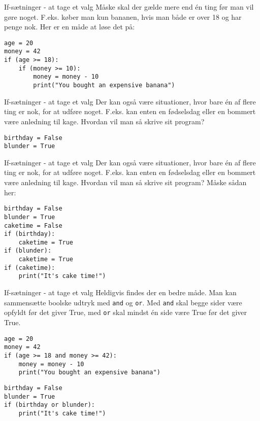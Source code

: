 \documentclass[main.tex]{subfiles}
\begin{document}
\begin{frame}[fragile]{If-sætninger - at tage et valg}
	Måske skal der gælde mere end én ting før man vil gøre noget. F.eks. køber man kun bananen, hvis man både er over 18 og har penge nok. Her er en måde at løse det på:
	\begin{lstlisting}[style=python]
age = 20
money = 42
if (age >= 18):
	if (money >= 10):
		money = money - 10
		print("You bought an expensive banana")
	\end{lstlisting}
\end{frame}

\begin{frame}[fragile]{If-sætninger - at tage et valg}
	Der kan også være situationer, hvor bare én af flere ting er nok, for at udføre noget. F.eks. kan enten en fødselsdag eller en bommert være anledning til kage. Hvordan vil man så skrive sit program?
	\begin{lstlisting}[style=python]
birthday = False
blunder = True
	\end{lstlisting}
\end{frame}

\begin{frame}[fragile]{If-sætninger - at tage et valg}
	Der kan også være situationer, hvor bare én af flere ting er nok, for at udføre noget. F.eks. kan enten en fødselsdag eller en bommert være anledning til kage. Hvordan vil man så skrive sit program? \pause Måske sådan her:
	\begin{lstlisting}[style=python]
birthday = False
blunder = True
caketime = False
if (birthday):
	caketime = True
if (blunder):
	caketime = True
if (caketime):
	print("It's cake time!")
	\end{lstlisting}
\end{frame}


\begin{frame}[fragile]{If-sætninger - at tage et valg}
	Heldigvis findes der en bedre måde. Man kan sammensætte boolske udtryk med \texttt{and} og \texttt{or}. Med \texttt{and} skal begge sider være opfyldt før det giver True, med \texttt{or} skal mindst én side være True før det giver True.
	\pause 
	\begin{lstlisting}[style=python]
age = 20
money = 42
if (age >= 18 and money >= 42):
	money = money - 10
	print("You bought an expensive banana")
	\end{lstlisting}
	
	\begin{lstlisting}[style=python]
birthday = False
blunder = True
if (birthday or blunder):
	print("It's cake time!")
	\end{lstlisting}
\end{frame}
\end{document}
